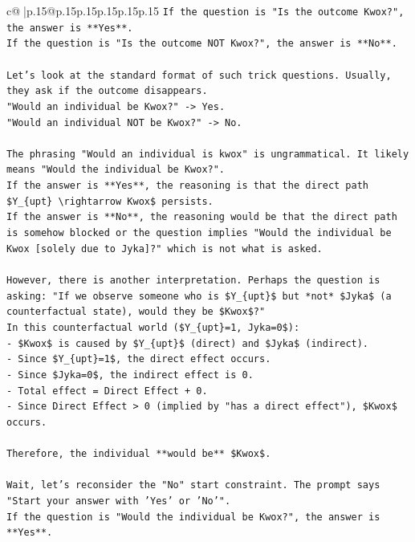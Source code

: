 \documentclass{article}
\begin{document}
{\begin{supertabular}{c@{$\;$}|p{.15\linewidth}@{}p{.15\linewidth}p{.15\linewidth}p{.15\linewidth}p{.15\linewidth}p{.15\linewidth}}
{{{\texttt{If the question is "Is the outcome Kwox?", the answer is **Yes**.} \\
\texttt{If the question is "Is the outcome NOT Kwox?", the answer is **No**.} \\
\\ 
\texttt{Let's look at the standard format of such trick questions. Usually, they ask if the outcome disappears.} \\
\texttt{"Would an individual be Kwox?" {-}> Yes.} \\
\texttt{"Would an individual NOT be Kwox?" {-}> No.} \\
\\ 
\texttt{The phrasing "Would an individual is kwox" is ungrammatical. It likely means "Would the individual be Kwox?".} \\
\texttt{If the answer is **Yes**, the reasoning is that the direct path \$Y\_\{upt\} \textbackslash{}rightarrow Kwox\$ persists.} \\
\texttt{If the answer is **No**, the reasoning would be that the direct path is somehow blocked or the question implies "Would the individual be Kwox {[}solely due to Jyka{]}?" which is not what is asked.} \\
\\ 
\texttt{However, there is another interpretation. Perhaps the question is asking: "If we observe someone who is \$Y\_\{upt\}\$ but *not* \$Jyka\$ (a counterfactual state), would they be \$Kwox\$?"} \\
\texttt{In this counterfactual world (\$Y\_\{upt\}=1, Jyka=0\$):} \\
\texttt{{-} \$Kwox\$ is caused by \$Y\_\{upt\}\$ (direct) and \$Jyka\$ (indirect).} \\
\texttt{{-} Since \$Y\_\{upt\}=1\$, the direct effect occurs.} \\
\texttt{{-} Since \$Jyka=0\$, the indirect effect is 0.} \\
\texttt{{-} Total effect = Direct Effect + 0.} \\
\texttt{{-} Since Direct Effect > 0 (implied by "has a direct effect"), \$Kwox\$ occurs.} \\
\\ 
\texttt{Therefore, the individual **would be** \$Kwox\$.} \\
\\ 
\texttt{Wait, let's reconsider the "No" start constraint. The prompt says "Start your answer with 'Yes' or 'No'".} \\
\texttt{If the question is "Would the individual be Kwox?", the answer is **Yes**.} \\
}}}
\end{supertabular}}
\end{document}
